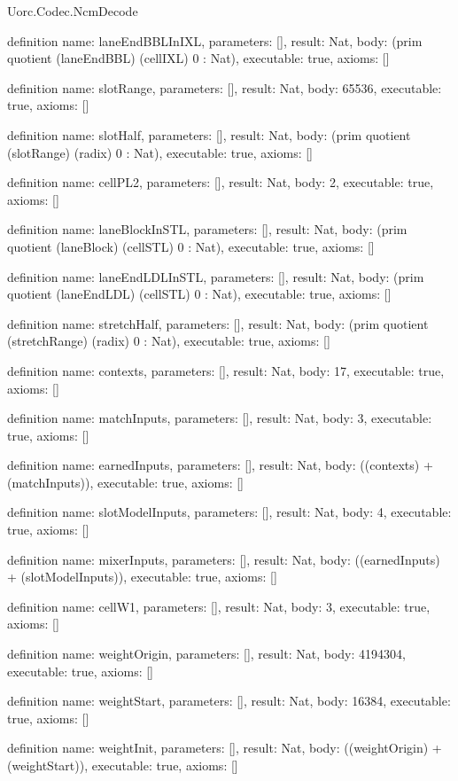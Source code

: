 \begin{lexlean}{Uorc.Codec.NcmDecode}
\begin{semanticmodule}
definition{
  name: laneEndBBLInIXL,
  parameters: [],
  result: Nat,
  body: (prim quotient (laneEndBBL) (cellIXL) 0 : Nat),
  executable: true,
  axioms: []
}

definition{
  name: slotRange,
  parameters: [],
  result: Nat,
  body: 65536,
  executable: true,
  axioms: []
}

definition{
  name: slotHalf,
  parameters: [],
  result: Nat,
  body: (prim quotient (slotRange) (radix) 0 : Nat),
  executable: true,
  axioms: []
}

definition{
  name: cellPL2,
  parameters: [],
  result: Nat,
  body: 2,
  executable: true,
  axioms: []
}

definition{
  name: laneBlockInSTL,
  parameters: [],
  result: Nat,
  body: (prim quotient (laneBlock) (cellSTL) 0 : Nat),
  executable: true,
  axioms: []
}

definition{
  name: laneEndLDLInSTL,
  parameters: [],
  result: Nat,
  body: (prim quotient (laneEndLDL) (cellSTL) 0 : Nat),
  executable: true,
  axioms: []
}

definition{
  name: stretchHalf,
  parameters: [],
  result: Nat,
  body: (prim quotient (stretchRange) (radix) 0 : Nat),
  executable: true,
  axioms: []
}

definition{
  name: contexts,
  parameters: [],
  result: Nat,
  body: 17,
  executable: true,
  axioms: []
}

definition{
  name: matchInputs,
  parameters: [],
  result: Nat,
  body: 3,
  executable: true,
  axioms: []
}

definition{
  name: earnedInputs,
  parameters: [],
  result: Nat,
  body: ((contexts) + (matchInputs)),
  executable: true,
  axioms: []
}

definition{
  name: slotModelInputs,
  parameters: [],
  result: Nat,
  body: 4,
  executable: true,
  axioms: []
}

definition{
  name: mixerInputs,
  parameters: [],
  result: Nat,
  body: ((earnedInputs) + (slotModelInputs)),
  executable: true,
  axioms: []
}

definition{
  name: cellW1,
  parameters: [],
  result: Nat,
  body: 3,
  executable: true,
  axioms: []
}

definition{
  name: weightOrigin,
  parameters: [],
  result: Nat,
  body: 4194304,
  executable: true,
  axioms: []
}

definition{
  name: weightStart,
  parameters: [],
  result: Nat,
  body: 16384,
  executable: true,
  axioms: []
}

definition{
  name: weightInit,
  parameters: [],
  result: Nat,
  body: ((weightOrigin) + (weightStart)),
  executable: true,
  axioms: []
}


\end{semanticmodule}
\end{lexlean}
